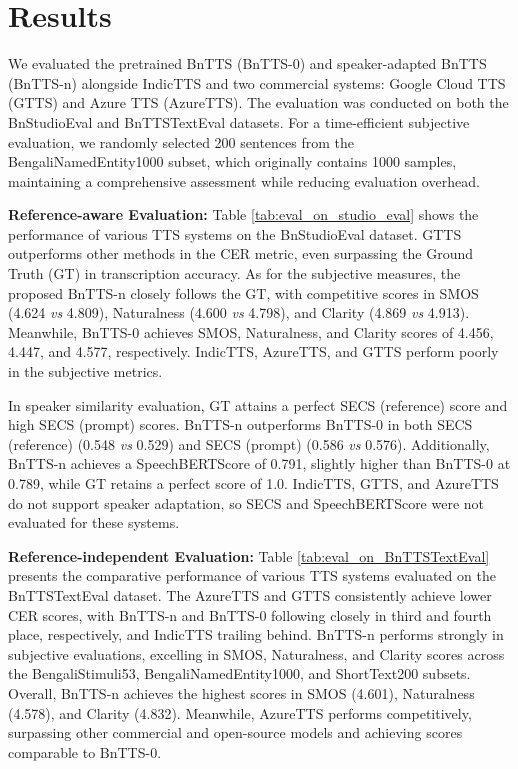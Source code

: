 \section{Results}
\label{sec:results}
We evaluated the pretrained BnTTS (BnTTS-0) and speaker-adapted BnTTS (BnTTS-n) alongside IndicTTS \cite{indictts2022} and two commercial systems: Google Cloud TTS (GTTS) and Azure TTS (AzureTTS). The evaluation was conducted on both the BnStudioEval and BnTTSTextEval datasets. For a time-efficient subjective evaluation, we randomly selected 200 sentences from the BengaliNamedEntity1000 subset, which originally contains 1000 samples, maintaining a comprehensive assessment while reducing evaluation overhead.


\noindent \textbf{ Reference-aware Evaluation:}
Table \ref{tab:eval_on_studio_eval} shows the performance of various TTS systems on the BnStudioEval dataset. GTTS outperforms other methods in the CER metric, even surpassing the Ground Truth (GT) in transcription accuracy. As for the subjective measures, the proposed BnTTS-n closely follows the GT, with competitive scores in SMOS (4.624 {\em vs} 4.809), Naturalness (4.600 {\em vs} 4.798), and Clarity (4.869 {\em vs} 4.913). Meanwhile, BnTTS-0 achieves SMOS, Naturalness, and Clarity scores of 4.456, 4.447, and 4.577, respectively. IndicTTS, AzureTTS, and GTTS perform poorly in the subjective metrics.

In speaker similarity evaluation, GT attains a perfect SECS (reference) score and high SECS (prompt) scores. BnTTS-n outperforms BnTTS-0 in both SECS (reference) (0.548 {\em vs} 0.529) and SECS (prompt) (0.586 {\em vs} 0.576). Additionally, BnTTS-n achieves a SpeechBERTScore of 0.791, slightly higher than BnTTS-0 at 0.789, while GT retains a perfect score of 1.0. IndicTTS, GTTS, and AzureTTS do not support speaker adaptation, so SECS and SpeechBERTScore were not evaluated for these systems.

\noindent \textbf{ Reference-independent Evaluation:} Table \ref{tab:eval_on_BnTTSTextEval} presents the comparative performance of various TTS systems evaluated on the BnTTSTextEval dataset. The AzureTTS and GTTS consistently achieve lower CER scores, with BnTTS-n and BnTTS-0 following closely in third and fourth place, respectively, and IndicTTS trailing behind.
BnTTS-n performs strongly in subjective evaluations, excelling in SMOS, Naturalness, and Clarity scores across the BengaliStimuli53, BengaliNamedEntity1000, and ShortText200 subsets. Overall, BnTTS-n achieves the highest scores in SMOS (4.601), Naturalness (4.578), and Clarity (4.832). Meanwhile, AzureTTS performs competitively, surpassing other commercial and open-source models and achieving scores comparable to BnTTS-0. 


